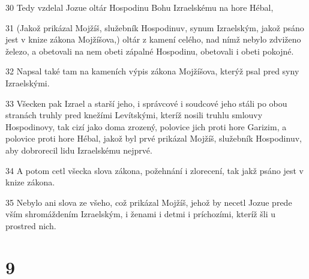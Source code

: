 \par 30 Tedy vzdelal Jozue oltár Hospodinu Bohu Izraelskému na hore Hébal,
\par 31 (Jakož prikázal Mojžíš, služebník Hospodinuv, synum Izraelským, jakož psáno jest v knize zákona Mojžíšova,) oltár z kamení celého, nad nímž nebylo zdviženo železo, a obetovali na nem obeti zápalné Hospodinu, obetovali i obeti pokojné.
\par 32 Napsal také tam na kameních výpis zákona Mojžíšova, kterýž psal pred syny Izraelskými.
\par 33 Všecken pak Izrael a starší jeho, i správcové i soudcové jeho stáli po obou stranách truhly pred knežími Levítskými, kteríž nosili truhlu smlouvy Hospodinovy, tak cizí jako doma zrozený, polovice jich proti hore Garizim, a polovice proti hore Hébal, jakož byl prvé prikázal Mojžíš, služebník Hospodinuv, aby dobrorecil lidu Izraelskému nejprvé.
\par 34 A potom cetl všecka slova zákona, požehnání i zlorecení, tak jakž psáno jest v knize zákona.
\par 35 Nebylo ani slova ze všeho, což prikázal Mojžíš, jehož by necetl Jozue prede vším shromáždením Izraelským, i ženami i detmi i príchozími, kteríž šli u prostred nich.

\chapter{9}

